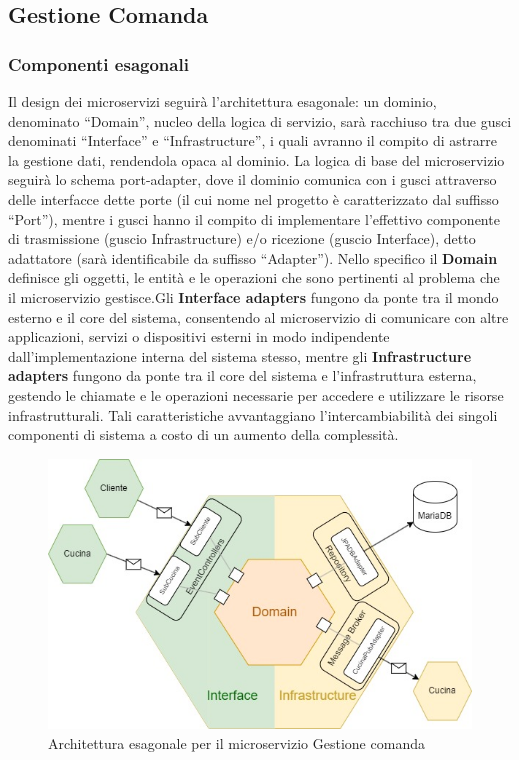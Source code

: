 \subsection{Gestione Comanda}
\subsubsection{Componenti esagonali}
Il design dei microservizi seguirà l’architettura esagonale: un dominio, denominato “Domain”, nucleo della logica di servizio, sarà racchiuso tra due gusci denominati “Interface” e “Infrastructure”, i quali avranno il compito di astrarre la gestione dati, rendendola opaca al dominio. La logica di base del microservizio seguirà lo schema port-adapter, dove il dominio comunica con i gusci attraverso delle interfacce dette porte (il cui nome nel progetto è caratterizzato dal suffisso “Port”), mentre i gusci hanno il compito di implementare l’effettivo componente di trasmissione (guscio Infrastructure) e/o ricezione (guscio Interface), detto adattatore (sarà identificabile da suffisso “Adapter”). 
Nello specifico il \textbf{Domain} definisce gli oggetti, le entità e le operazioni che sono pertinenti al problema che il microservizio gestisce.Gli \textbf{Interface adapters} fungono da ponte tra il mondo esterno e il core del sistema, consentendo al microservizio di comunicare con altre applicazioni, servizi o dispositivi esterni in modo indipendente dall'implementazione interna del sistema stesso, mentre gli \textbf{Infrastructure adapters} fungono da ponte tra il core del sistema e l'infrastruttura esterna, gestendo le chiamate e le operazioni necessarie per accedere e utilizzare le risorse infrastrutturali.
Tali caratteristiche avvantaggiano l’intercambiabilità dei singoli componenti di sistema a costo di un aumento della complessità.
\begin{figure}[H]
	\centering
	\includegraphics[scale=0.7]{iterazione1/images/hexagon.jpg}
	\caption{Architettura esagonale per il microservizio Gestione comanda\label{fig:hexagon}}
\end{figure}

